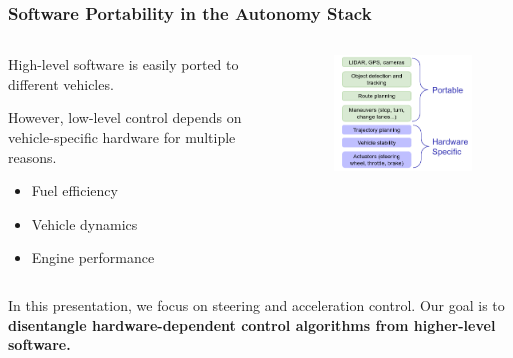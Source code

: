 \documentclass{beamer}
\begin{document}
\begin{frame}
\frametitle{Software Portability in the Autonomy Stack}

\begin{columns}
	\begin{column}{0.5\linewidth}
High-level software
is easily ported to different vehicles.
		
		However, low-level control depends on vehicle-specific hardware for multiple reasons.
		\begin{itemize}
			\item Fuel efficiency
			\item Vehicle dynamics
			\item Engine performance
		\end{itemize}
		\end{column}
	\begin{column}{0.45\linewidth}
		\begin{figure}
			\includegraphics[width=1.0\linewidth]{figures/autonomy_stack_small.png}
		\end{figure}
	\end{column}
\end{columns}
\vspace{1.0em}

In this presentation, we focus on steering and acceleration control. Our goal is to \textbf{disentangle hardware-dependent control algorithms from higher-level software.}
\end{frame}
\end{document}
